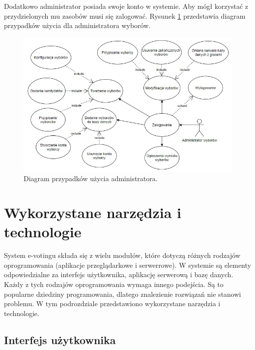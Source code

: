 \documentclass[a4paper,12pt]{book}
\begin{document}
Dodatkowo administrator posiada swoje konto w systemie. Aby mógł korzystać z przydzielonych mu zasobów musi się zalogować. Rysunek \ref{admin-use} przedstawia diagram przypadków użycia dla administratora wyborów.

\begin{figure}[h]
	\centering
	\includegraphics[width=\textwidth]{images/admin_use_case.jpg}
	\caption{Diagram przypadków użycia administratora.}\label{admin-use}
\end {figure}

\section {Wykorzystane narzędzia i technologie}

System e-votingu składa się z wielu modułów, które dotyczą różnych rodzajów oprogramowania (aplikacje przeglądarkowe i serwerrowe). W systemie są elementy odpowiedzialne za interfejs użytkownika, aplikację serwerową i bazę danych. Każdy z tych rodzajów oprogramowania wymaga innego podejścia. Są to popularne dziedziny programowania, dlatego znalezienie rozwiązań nie stanowi problemu. W tym podrozdziale przedstawiono wykorzystane narzędzia i technologie.

\subsection{Interfejs użytkownika}
\end{document}
